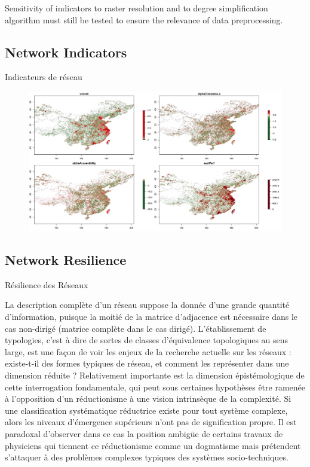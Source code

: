 Sensitivity of indicators to raster resolution and to degree simplification algorithm must still be tested to ensure the relevance of data preprocessing.







\subsection{Network Indicators}{Indicateurs de réseau}


\begin{figure}
\includegraphics[width=\linewidth]{Figures/Final/A-staticcorrelations-networkcn.jpg}
\label{fig:app:staticcorrelations:networkcn}
\end{figure}




\subsection{Network Resilience}{Résilience des Réseaux}





La description complète d'un réseau suppose la donnée d'une grande quantité d'information, puisque la moitié de la matrice d'adjacence est nécessaire dans le cas non-dirigé (matrice complète dans le cas dirigé). L'établissement de typologies, c'est à dire de sortes de classes d'équivalence topologiques au sens large, est une façon de voir les enjeux de la recherche actuelle sur les réseaux : existe-t-il des formes typiques de réseau, et comment les représenter dans une dimension réduite ? Relativement importante est la dimension épistémologique de cette interrogation fondamentale, qui peut sous certaines hypothèses être ramenée à l'opposition d'un réductionisme à une vision intrinsèque de la complexité. Si une classification systématique réductrice existe pour tout système complexe, alors les niveaux d'émergence supérieurs n'ont pas de signification propre. Il est paradoxal d'observer dans ce cas la position ambigüe de certains travaux de physiciens qui tiennent ce réductionisme comme un dogmatisme mais prétendent s'attaquer à des problèmes complexes typiques des systèmes socio-techniques.

